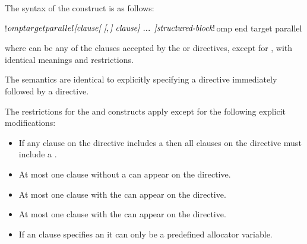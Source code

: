 \begin{samepage}
\begin{fortranspecific}
The syntax of the   construct is as follows:

\begin{ompfPragma}
!$omp target parallel \plc{[clause[ [},\plc{] clause] ... ]}
    \plc{structured-block}
!$omp end target parallel
\end{ompfPragma}

where  can be any of the clauses accepted by the  or
 directives, except for , with identical meanings and restrictions.
\end{fortranspecific}
\end{samepage}

\descr
The semantics are identical to explicitly specifying a  directive
immediately followed by a  directive.

\restrictions

The restrictions for the  and  constructs apply except for the following explicit modifications:

\begin{itemize}
\item If any  clause on the directive includes a
       then all  clauses
      on the directive must include a .

\item At most one  clause without a
       can appear on the directive.

\item At most one  clause with the 
       can appear on the directive.


\item At most one  clause with the 
       can appear on the directive.

\item If an  clause specifies an  it can only be a predefined allocator variable.
\end{itemize}

